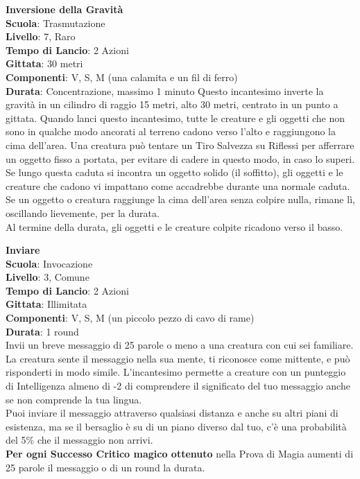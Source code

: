 \begin{multicols}{2}
\medskip\textbf{Inversione della Gravità}\\
\textbf{Scuola}: Trasmutazione\\
\textbf{Livello}: 7, Raro\\
\textbf{Tempo di Lancio}: 2 Azioni\\
\textbf{Gittata}: 30 metri\\
\textbf{Componenti}: V, S, M (una calamita e un fil di ferro)\\
\textbf{Durata}: Concentrazione, massimo 1 minuto
Questo incantesimo inverte la gravità in un cilindro di raggio 15 metri, alto 30 metri, centrato in un punto a gittata. Quando lanci questo incantesimo, tutte le creature e gli oggetti che non sono in qualche modo ancorati al terreno cadono verso l'alto e raggiungono la cima dell'area. Una creatura può tentare un Tiro Salvezza su Riflessi per afferrare un oggetto fisso a portata, per evitare di cadere in questo modo, in caso lo superi.\\
Se lungo questa caduta si incontra un oggetto solido (il soffitto), gli oggetti e le creature che cadono vi impattano come accadrebbe durante una normale caduta. Se un oggetto o creatura raggiunge la cima dell'area senza colpire nulla, rimane lì, oscillando lievemente, per la durata.\\
Al termine della durata, gli oggetti e le creature colpite ricadono verso il basso.

\medskip\textbf{Inviare}\\
\textbf{Scuola}: Invocazione\\
\textbf{Livello}: 3, Comune\\
\textbf{Tempo di Lancio}: 2 Azioni\\
\textbf{Gittata}: Illimitata\\
\textbf{Componenti}: V, S, M (un piccolo pezzo di cavo di rame)\\
\textbf{Durata}: 1 round\\
Invii un breve messaggio di 25 parole o meno a una creatura con cui sei familiare. La creatura sente il messaggio nella sua mente, ti riconosce come mittente, e può risponderti in modo simile. L'incantesimo permette a creature con un punteggio di Intelligenza almeno di -2 di comprendere il significato del tuo messaggio anche se non comprende la tua lingua.\\
Puoi inviare il messaggio attraverso qualsiasi distanza e anche su altri piani di esistenza, ma se il bersaglio è su di un piano diverso dal tuo, c'è una probabilità del 5\% che il messaggio non arrivi.\\
\textbf{Per ogni Successo Critico magico ottenuto} nella Prova di Magia aumenti di 25 parole il messaggio o di un round la durata.


\end{multicols}
